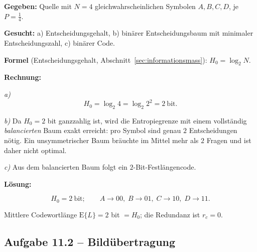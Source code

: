 \begin{beispiel}

\textbf{Gegeben:} Quelle mit $N = 4$ gleichwahrscheinlichen Symbolen
$A,B,C,D$, je $P = \tfrac14$.

\textbf{Gesucht:} a) Entscheidungsgehalt, b) binärer Entscheidungsbaum mit
minimaler Entscheidungszahl, c) binärer Code.

\textbf{Formel} (Entscheidungsgehalt, Abschnitt~\ref{sec:informationsmass}):
$H_0 = \log_2 N$.

\textbf{Rechnung:}

\emph{a)}
$$
H_0 = \log_2 4 = \log_2 2^2 = 2\ \text{bit}.
$$

\emph{b)} Da $H_0 = 2$ bit ganzzahlig ist, wird die Entropiegrenze mit einem
vollständig \emph{balancierten} Baum exakt erreicht: pro Symbol sind genau
$2$ Entscheidungen nötig. Ein unsymmetrischer Baum bräuchte im Mittel mehr als
$2$ Fragen und ist daher nicht optimal.

\emph{c)} Aus dem balancierten Baum folgt ein $2$-Bit-Festlängencode.

\textbf{Lösung:}

$$
\boxed{\;H_0 = 2\ \text{bit}; \qquad
A\to 00,\; B\to 01,\; C\to 10,\; D\to 11.\;}
$$

\begin{center}
\end{center}

Mittlere Codewortlänge $\mathrm{E}\{L\} = 2$ bit $= H_0$; die Redundanz ist
$r_c = 0$.

\end{beispiel}

\subsection*{Aufgabe 11.2 – Bildübertragung}

